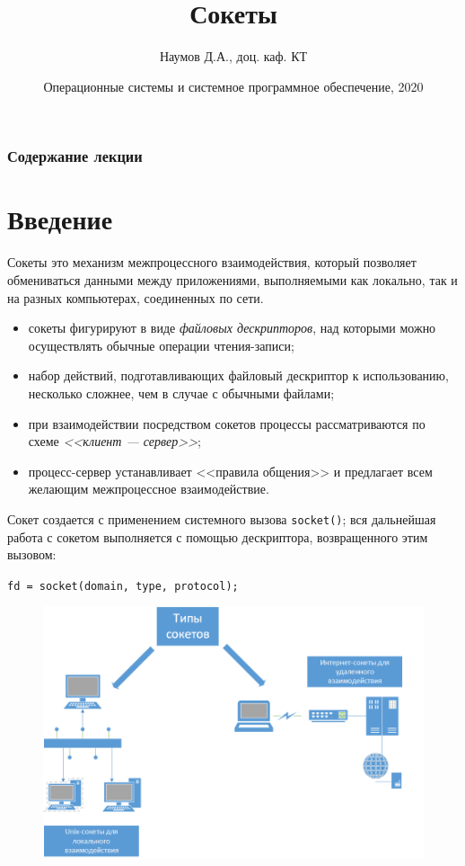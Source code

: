 \documentclass{beamer}
\title[Язык C]{Сокеты}
\author{Наумов Д.А., доц. каф. КТ}
\date[10.09.2019] {Операционные системы и системное программное обеспечение, 2020}
\begin{document}
\begin{frame}
  \titlepage
\end{frame}
  
\begin{frame}
  \frametitle{Содержание лекции}
  \tableofcontents  
\end{frame}

\section{Введение}

\begin{frame}
	\begin{block}{Сокеты}
		это механизм межпроцессного взаимодействия, который позволяет обмениваться данными между приложениями, выполняемыми как локально, так и на разных компьютерах, соединенных по сети.
	\end{block}         
	\begin{itemize}
		\item сокеты фигурируют в виде \textit{файловых дескрипторов}, над которыми можно осуществлять обычные операции чтения-записи;
		\item набор действий, подготавливающих файловый дескриптор к использованию, несколько сложнее, чем в случае с обычными файлами;
		\item при взаимодействии посредством сокетов процессы рассматриваются по схеме \textit{<<клиент — сервер>>};
		\item процесс-сервер устанавливает <<правила общения>> и предлагает всем желающим межпроцессное взаимодействие.
\end{itemize}

    Сокет создается с применением системного вызова \texttt{socket()}; вся дальнейшая работа с сокетом выполняется с помощью дескриптора, возвращенного этим вызовом:
    
    \texttt{fd = socket(domain, type, protocol);}
\end{frame}

\begin{frame}
	\begin{figure}[h]
		\centering
		\includegraphics[scale=0.5]{images/lec12-pic01.png}
	\end{figure}
\end{frame}
\end{document}

